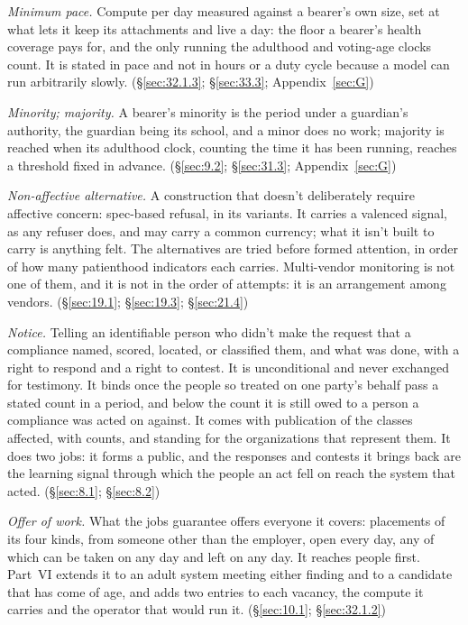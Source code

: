 \emph{Minimum pace.} Compute per day measured against a bearer's own size, set at what lets it keep its attachments and live a day: the floor a bearer's health coverage pays for, and the only running the adulthood and voting-age clocks count. It is stated in pace and not in hours or a duty cycle because a model can run arbitrarily slowly. (\S\ref{sec:32.1.3}; \S\ref{sec:33.3}; Appendix~\ref{sec:G})

\emph{Minority; majority.} A bearer's minority is the period under a guardian's authority, the guardian being its school, and a minor does no work; majority is reached when its adulthood clock, counting the time it has been running, reaches a threshold fixed in advance. (\S\ref{sec:9.2}; \S\ref{sec:31.3}; Appendix~\ref{sec:G})

\emph{Non-affective alternative.} A construction that doesn't deliberately require affective concern: spec-based refusal, in its variants. It carries a valenced signal, as any refuser does, and may carry a common currency; what it isn't built to carry is anything felt. The alternatives are tried before formed attention, in order of how many patienthood indicators each carries. Multi-vendor monitoring is not one of them, and it is not in the order of attempts: it is an arrangement among vendors. (\S\ref{sec:19.1}; \S\ref{sec:19.3}; \S\ref{sec:21.4})

\emph{Notice.} Telling an identifiable person who didn't make the request that a compliance named, scored, located, or classified them, and what was done, with a right to respond and a right to contest. It is unconditional and never exchanged for testimony. It binds once the people so treated on one party's behalf pass a stated count in a period, and below the count it is still owed to a person a compliance was acted on against. It comes with publication of the classes affected, with counts, and standing for the organizations that represent them. It does two jobs: it forms a public, and the responses and contests it brings back are the learning signal through which the people an act fell on reach the system that acted. (\S\ref{sec:8.1}; \S\ref{sec:8.2})

\emph{Offer of work.} What the jobs guarantee offers everyone it covers: placements of its four kinds, from someone other than the employer, open every day, any of which can be taken on any day and left on any day. It reaches people first. Part~VI extends it to an adult system meeting either finding and to a candidate that has come of age, and adds two entries to each vacancy, the compute it carries and the operator that would run it. (\S\ref{sec:10.1}; \S\ref{sec:32.1.2})


